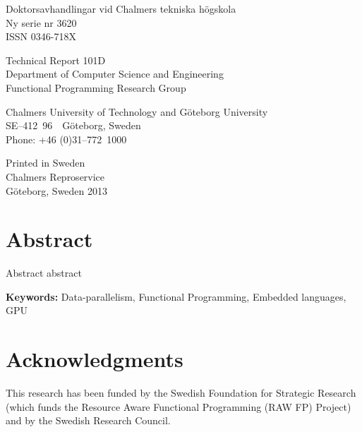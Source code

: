 \documentclass[a4paper]{book}
\newcommand{\dept}{Department of Computer Science and Engineering}
\newcommand{\uni}{Chalmers University of Technology and G\"oteborg University}
\newcommand{\group}{Functional Programming Research Group}
\begin{document}
\noindent Doktorsavhandlingar vid Chalmers tekniska högskola \\
\noindent Ny serie nr 3620 \\
\noindent ISSN 0346-718X \\

\vspace{1cm}

\noindent Technical Report 101D\\
\noindent \dept \\
\noindent \group\\

\vspace{1cm} 

\noindent \uni \\
\noindent SE--412~96~~G\"oteborg, Sweden\\
\noindent Phone: +46 (0)31--772~1000 \\

\vspace{1cm} 

\noindent Printed in Sweden\\
\noindent Chalmers Reproservice\\
\noindent G\"oteborg, Sweden 2013


\thispagestyle{empty}

\clearpage
{}

\section*{Abstract}
Abstract abstract 

\vspace{5mm}

\noindent

\textbf{Keywords:} Data-parallelism, Functional Programming, Embedded languages, GPU

\clearpage

\section*{Acknowledgments}


\vspace{5mm}
\noindent This research has been funded by the Swedish Foundation for
Strategic Research (which funds the Resource Aware Functional 
Programming (RAW FP) Project) and by the Swedish Research Council.
\end{document}
